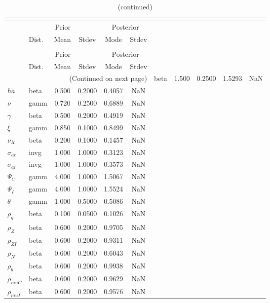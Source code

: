  
\begin{center}
\begin{longtable}{llcccc} 
\caption{Results from posterior maximization (parameters)}\\
 \label{Table:Posterior:1}\\
\toprule 
  & \multicolumn{3}{c}{Prior}  &  \multicolumn{2}{c}{Posterior} \\
  \cmidrule(r{.75em}){2-4} \cmidrule(r{.75em}){5-6}
  & Dist. & Mean  & Stdev & Mode & Stdev \\ 
\midrule \endfirsthead 
\caption{(continued)}\\
 \bottomrule 
  & \multicolumn{3}{c}{Prior}  &  \multicolumn{2}{c}{Posterior} \\
  \cmidrule(r{.75em}){2-4} \cmidrule(r{.75em}){5-6}
  & Dist. & Mean  & Stdev & Mode & Stdev \\ 
\midrule \endhead 
\bottomrule \multicolumn{6}{r}{(Continued on next page)}\endfoot 
\bottomrule\endlastfoot 
${\sigma}$ & beta &   1.500 & 0.2500 &   1.5293 &     NaN \\ 
${ha}$ & beta &   0.500 & 0.2000 &   0.4057 &     NaN \\ 
$\nu$ & gamm &   0.720 & 0.2500 &   0.6889 &     NaN \\ 
$\gamma$ & beta &   0.500 & 0.2000 &   0.4919 &     NaN \\ 
$\xi$ & gamm &   0.850 & 0.1000 &   0.8499 &     NaN \\ 
${\nu_R}$ & beta &   0.200 & 0.1000 &   0.1457 &     NaN \\ 
${\sigma_{ac}}$ & invg &   1.000 & 1.0000 &   0.3123 &     NaN \\ 
${\sigma_{ai}}$ & invg &   1.000 & 1.0000 &   0.3573 &     NaN \\ 
${\Psi_{C}}$ & gamm &   4.000 & 1.0000 &   1.5067 &     NaN \\ 
${\Psi_I}$ & gamm &   4.000 & 1.0000 &   1.5524 &     NaN \\ 
${\theta}$ & gamm &   1.000 & 0.5000 &   0.5086 &     NaN \\ 
${\rho_g}$ & beta &   0.100 & 0.0500 &   0.1026 &     NaN \\ 
${\rho_Z}$ & beta &   0.600 & 0.2000 &   0.9705 &     NaN \\ 
${\rho_{ZI}}$ & beta &   0.600 & 0.2000 &   0.9311 &     NaN \\ 
${\rho_N}$ & beta &   0.600 & 0.2000 &   0.6043 &     NaN \\ 
${\rho_b}$ & beta &   0.600 & 0.2000 &   0.9938 &     NaN \\ 
${\rho_{muC}}$ & beta &   0.600 & 0.2000 &   0.9629 &     NaN \\ 
${\rho_{muI}}$ & beta &   0.600 & 0.2000 &   0.9576 &     NaN \\ 
\end{longtable}
 \end{center}
